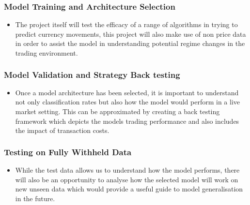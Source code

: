 \documentclass[11pt, a4paper]{article}
\begin{document}
 \subsubsection{Model Training and Architecture Selection}
	\begin{itemize}
	\item The project itself will test the efficacy of a range of algorithms in trying to predict currency movements, this project will also make use of non price data in order to assist the model in understanding potential regime changes in the trading environment. 
	\end{itemize}
 \subsubsection{Model Validation and Strategy Back testing}
	\begin{itemize}
	\item Once a model architecture has been selected, it is important to understand not only classification rates but also how the model would perform in a live market setting. This can be approximated by creating a back testing framework which depicts the models trading performance and also includes the impact of transaction costs.
	\end{itemize}
\subsubsection{Testing on Fully Withheld Data}
	\begin{itemize}
	\item While the test data allows us to understand how the model performs, there will also be an opportunity to analyse how the selected model will work on new unseen data which would provide a useful guide to model generalisation in the future.
	\end{itemize}
\end{document}
